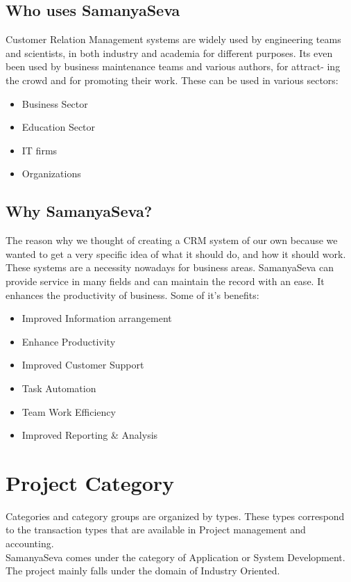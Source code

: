 \subsection{Who uses SamanyaSeva}
Customer Relation Management systems are widely used by engineering teams and scientists, in both industry and academia
for different purposes. Its even been used by business maintenance teams and various authors, for attract-
ing the crowd and for promoting their work. 
These can be used in various sectors:
\begin{itemize}
	\item Business Sector
	\item Education Sector
	\item IT firms
	\item Organizations
\end{itemize}

\subsection{Why SamanyaSeva?}
The reason why we thought of creating a CRM system of our own because we wanted to get a very specific idea
of what it should do, and how it should work. These systems are a necessity nowadays
for business areas. SamanyaSeva can provide service in many fields and can maintain the record with an ease. It enhances the productivity of business.
Some of it's benefits:
\begin{itemize}
	\item Improved Information arrangement
	\item  Enhance Productivity
	\item Improved Customer Support
	\item Task Automation
	 \item Team Work Efficiency
	 \item Improved Reporting \& Analysis
\end{itemize}

\section{Project Category}
Categories and category groups are organized by types. These types correspond to the transaction types that are available in Project management and accounting.\\
SamanyaSeva comes under the category of Application or System Development. The project mainly falls under the domain of Industry Oriented. 

